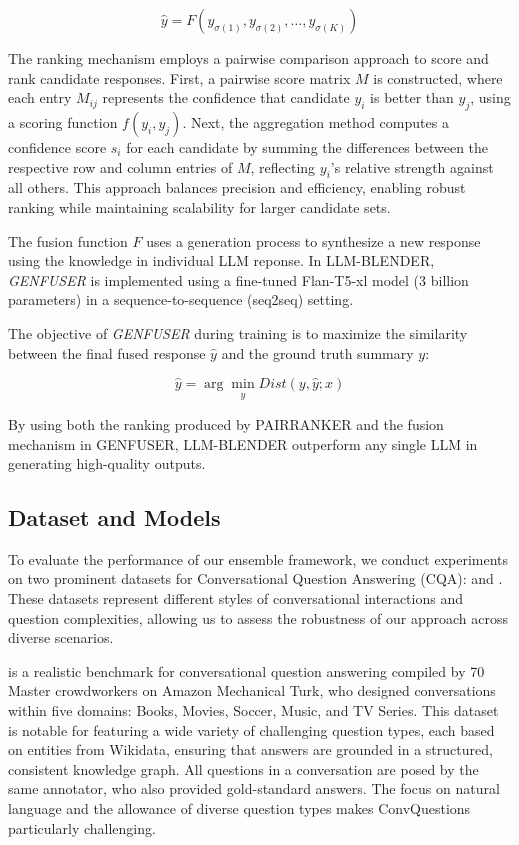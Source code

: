 \documentclass[sigconf,authordraft]{acmart}
\begin{document}
\[
\hat{y} = F(y_{\sigma(1)}, y_{\sigma(2)}, \ldots, y_{\sigma(K)})
\]



The ranking mechanism employs a pairwise comparison approach to score and rank candidate responses. First, a pairwise score matrix \(M\) is constructed, where each entry \(M_{ij}\) represents the confidence that candidate \(y_i\) is better than \(y_j\), using a scoring function \(f(y_i, y_j)\). Next, the aggregation method computes a confidence score \(s_i\) for each candidate by summing the differences between the respective row and column entries of \(M\), reflecting \(y_i\)'s relative strength against all others. This approach balances precision and efficiency, enabling robust ranking while maintaining scalability for larger candidate sets.


The fusion function \( F \) uses a generation process to synthesize a new response using the knowledge in individual LLM reponse. In LLM-BLENDER, \textit{GENFUSER} is implemented using a fine-tuned Flan-T5-xl model (3 billion parameters) in a sequence-to-sequence (seq2seq) setting.

The objective of \textit{GENFUSER} during training is to maximize the similarity between the final fused response \( \hat{y} \) and the ground truth summary \( y \):

\[
\hat{y} = \arg\min_{\hat{y}} Dist(y, \hat{y}; x)
\]

By using both the ranking produced by PAIRRANKER and the fusion mechanism in GENFUSER, LLM-BLENDER outperform any single LLM in generating high-quality outputs.


\subsection{Dataset and Models}
To evaluate the performance of our ensemble framework, we conduct experiments on two prominent datasets for Conversational Question Answering (CQA):  and . These datasets represent different styles of conversational interactions and question complexities, allowing us to assess the robustness of our approach across diverse scenarios.

 is a realistic benchmark for conversational question answering compiled by 70 Master crowdworkers on Amazon Mechanical Turk, who designed conversations within five domains: Books, Movies, Soccer, Music, and TV Series. This dataset is notable for featuring a wide variety of challenging question types, each based on entities from Wikidata, ensuring that answers are grounded in a structured, consistent knowledge graph. All questions in a conversation are posed by the same annotator, who also provided gold-standard answers. The focus on natural language and the allowance of diverse question types makes ConvQuestions particularly challenging.
\end{document}
